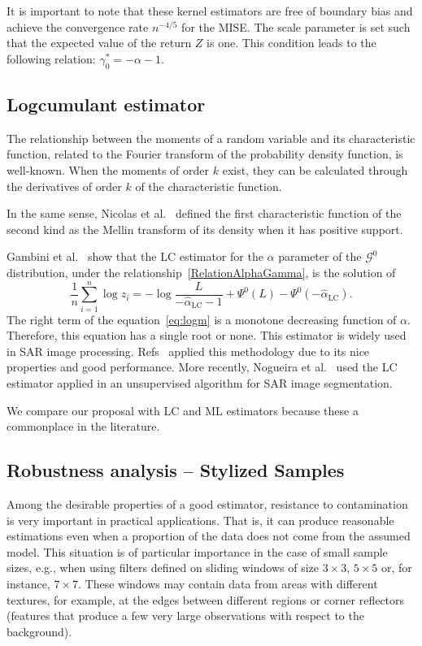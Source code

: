 \documentclass[twocolumn]{svjour3}
\begin{document}
	It is important to note that these kernel estimators are free of boundary bias and achieve the convergence rate $n^{-4/5}$ for the MISE.
	The scale parameter is set such that the expected value of the return $Z$ is one. 
	This condition leads to the following relation: $\gamma_0^*=-\alpha-1$.
	
	\subsection{Logcumulant estimator}\label{lc}
	
	The relationship between the moments of a random variable and its characteristic function, related to the Fourier transform of the probability density function, is well-known. 
	When the moments of order $k$ exist, they can be calculated through the derivatives of order $k$ of the characteristic function.
	
	In the same sense, Nicolas et al.~\cite{nicolas2002} defined the first characteristic function of the second kind as the Mellin transform of its density when it has positive support. 
	
	Gambini et al.~\cite{gambini2015} show that the LC estimator for the $\alpha$ parameter of the $\mathcal{G}^0$ distribution, under the relationship~\eqref{RelationAlphaGamma}, is the solution of 
	\begin{equation} \label{eq:logm}
	\frac{1}{n} \sum_{i=1}^n\log z_i =   -\log \frac{L}{-\widehat\alpha_{\text{{LC}}}-1} + \Psi^0(L) - \Psi^0(-\widehat\alpha_{\text{{LC}}}).
	\end{equation}
	The right term of the equation~\eqref{eq:logm} is a monotone decreasing function of $\alpha$. Therefore, this equation has a single root or none. 
	This estimator is widely used in SAR image processing. 
	Refs~\cite{MellinAnalysisPolSAR,BujorTrouveValetNicolas2004,khan2014} applied this methodology due to its nice properties and good performance. 
	More recently, Nogueira et al.~\cite{Nogueira2019} used the LC estimator applied in an unsupervised algorithm for SAR image segmentation.
	
	We compare our proposal with LC and ML estimators because these a commonplace in the literature.
	
	\subsection{Robustness analysis -- Stylized Samples}
	\label{robustez}
	Among the desirable properties of a good estimator, resistance to contamination is very important in practical applications. 
	That is, it can produce reasonable estimations even when a proportion of the data does not come from the assumed model. 
	This situation is of particular importance in the case of small sample sizes, e.g., when using filters defined on sliding windows of size $3 \times 3$, $5 \times 5$ or, for instance, $7 \times 7$. 
	These windows may contain data from areas with different textures, for example, at the edges between different regions or corner reflectors (features that produce a few very large observations with respect to the background).
	
\end{document}
